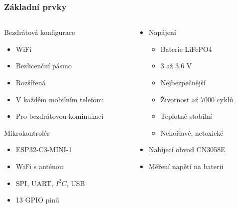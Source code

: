 \documentclass[%
  12pt,       				%
	t,                  %
	aspectratio=1610,   %
	unicode,						%
]{beamer}				    	%
\begin{document}
\begin{frame} 
	\frametitle{Základní prvky}
	
	\begin{columns}[T] 								%
		\begin{column}{0.5\textwidth}		%
			Bezdrátová konfigurace
			\begin{itemize}
				\item WiFi
				\item Bezlicenční pásmo
				\item Rozšířená 
				\item V každém mobilním telefonu
				\item Pro bezdrátovou kominukaci
			\end{itemize}
			Mikrokontrolér
			\begin{itemize}
				\item ESP32-C3-MINI-1
				\item WiFi s anténou 
				\item SPI, UART, $I^2C$, USB
				\item 13 GPIO pinů
			\end{itemize}
		\end{column}
		\begin{column}{0.5\textwidth}		%
			\begin{itemize}
				\item Napájení
				\begin{itemize}
					\item Baterie LiFePO4
					\item 3 až 3,6 V
					\item Nejbezpečnější
					\item Životnost až 7000 cyklů 
					\item Teplotně stabilní
					\item Nehořlavé, netoxické
				\end{itemize}
				\item Nabíjecí obvod CN3058E
				\item Měření napětí na baterii 
			\end{itemize}
		\end{column}
	\end{columns}											%
\end{frame}
\end{document}
